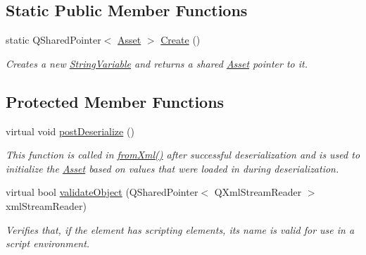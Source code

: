 \subsection*{Static Public Member Functions}
\begin{DoxyCompactItemize}
\item 
\hypertarget{class_picto_1_1_string_variable_a7596e4484b28dfc0c12b130f1ed59422}{static Q\-Shared\-Pointer$<$ \hyperlink{class_picto_1_1_asset}{Asset} $>$ \hyperlink{class_picto_1_1_string_variable_a7596e4484b28dfc0c12b130f1ed59422}{Create} ()}\label{class_picto_1_1_string_variable_a7596e4484b28dfc0c12b130f1ed59422}

\begin{DoxyCompactList}\small\item\em Creates a new \hyperlink{class_picto_1_1_string_variable}{String\-Variable} and returns a shared \hyperlink{class_picto_1_1_asset}{Asset} pointer to it. \end{DoxyCompactList}\end{DoxyCompactItemize}
\subsection*{Protected Member Functions}
\begin{DoxyCompactItemize}
\item 
virtual void \hyperlink{class_picto_1_1_string_variable_a1a1628007dc860d2f092f9fbb03944f1}{post\-Deserialize} ()
\begin{DoxyCompactList}\small\item\em This function is called in \hyperlink{class_picto_1_1_asset_a8bed4da09ecb1c07ce0dab313a9aba67}{from\-Xml()} after successful deserialization and is used to initialize the \hyperlink{class_picto_1_1_asset}{Asset} based on values that were loaded in during deserialization. \end{DoxyCompactList}\item 
\hypertarget{class_picto_1_1_string_variable_adbcca2dfd2b76a8d312f08cc14f7be6b}{virtual bool \hyperlink{class_picto_1_1_string_variable_adbcca2dfd2b76a8d312f08cc14f7be6b}{validate\-Object} (Q\-Shared\-Pointer$<$ Q\-Xml\-Stream\-Reader $>$ xml\-Stream\-Reader)}\label{class_picto_1_1_string_variable_adbcca2dfd2b76a8d312f08cc14f7be6b}

\begin{DoxyCompactList}\small\item\em Verifies that, if the element has scripting elements, its name is valid for use in a script environment. \end{DoxyCompactList}\end{DoxyCompactItemize}
